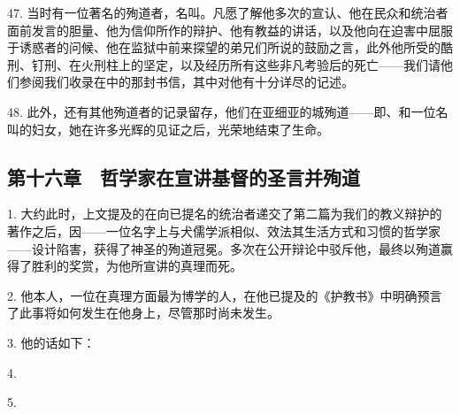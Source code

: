 47. 当时有一位著名的殉道者，名叫。凡愿了解他多次的宣认、他在民众和统治者面前发言的胆量、他为信仰所作的辩护、他有教益的讲话，以及他向在迫害中屈服于诱惑者的问候、他在监狱中前来探望的弟兄们所说的鼓励之言，此外他所受的酷刑、钉刑、在火刑柱上的坚定，以及经历所有这些非凡考验后的死亡——我们请他们参阅我们收录在中的那封书信，其中对他有十分详尽的记述。\par

48. 此外，还有其他殉道者的记录留存，他们在亚细亚的城殉道——即、和一位名叫的妇女，她在许多光辉的见证之后，光荣地结束了生命。\par


\subsection{第十六章　哲学家在宣讲基督的圣言并殉道}

1. 大约此时，上文提及的在向已提名的统治者递交了第二篇为我们的教义辩护的著作之后，因——一位名字上与犬儒学派相似、效法其生活方式和习惯的哲学家——设计陷害，获得了神圣的殉道冠冕。多次在公开辩论中驳斥他，最终以殉道赢得了胜利的奖赏，为他所宣讲的真理而死。\par

2. 他本人，一位在真理方面最为博学的人，在他已提及的《护教书》中明确预言了此事将如何发生在他身上，尽管那时尚未发生。\par

3. 他的话如下：\par

4. \par

5. \par

